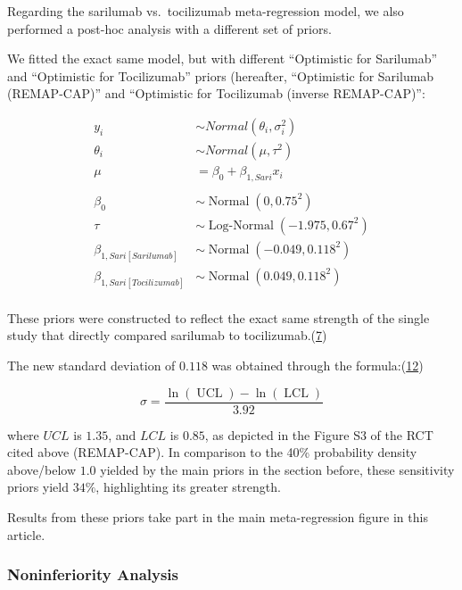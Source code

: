 \documentclass[
  12pt,
]{article}
\begin{document}
Regarding the sarilumab vs.~tocilizumab meta-regression model, we also
performed a post-hoc analysis with a different set of priors.

We fitted the exact same model, but with different ``Optimistic for
Sarilumab'' and ``Optimistic for Tocilizumab'' priors (hereafter,
``Optimistic for Sarilumab (REMAP-CAP)'' and ``Optimistic for
Tocilizumab (inverse REMAP-CAP)'':

\begin{align*}
y_i & \sim Normal(\theta_i, \sigma_i^2) \tag{Likelihood}\\
\theta_i & \sim Normal(\mu, \tau^2)\\
\mu &= \beta_0 + \beta_{1, Sari} x_i\\
\\
\beta_0 & \sim \operatorname{Normal}(0, 0.75^2) \tag{Priors}\\
\tau & \sim \operatorname{Log-Normal}(-1.975, 0.67^2)\\
\beta_{1, Sari[Sarilumab]} & \sim \operatorname{Normal}(-0.049, 0.118^2)\\
\beta_{1, Sari[Tocilizumab]} & \sim \operatorname{Normal}(0.049, 0.118^2)\\
\end{align*}

These priors were constructed to reflect the exact same strength of the
single study that directly compared sarilumab to
tocilizumab.(\protect\hyperlink{ref-zotero-3144}{7})

The new standard deviation of \(0.118\) was obtained through the
formula:(\protect\hyperlink{ref-cochrane632}{12})

\[\sigma = \frac{\ln(\operatorname{UCL}) - \ln(\operatorname{LCL})}{3.92}\]

where \(UCL\) is \(1.35\), and \(LCL\) is \(0.85\), as depicted in the
Figure S3 of the RCT cited above (REMAP-CAP). In comparison to the 40\%
probability density above/below \(1.0\) yielded by the main priors in
the section before, these sensitivity priors yield \(34\%\),
highlighting its greater strength.

Results from these priors take part in the main meta-regression figure
in this article.

\newpage

\hypertarget{noninferiority-analysis}{%
\subsubsection{Noninferiority Analysis}\label{noninferiority-analysis}}
\end{document}
